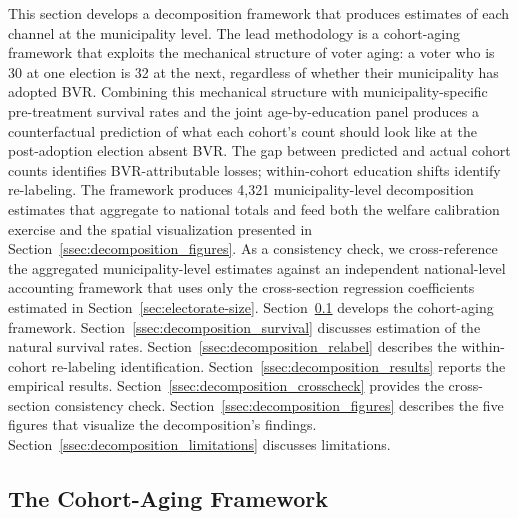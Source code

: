 This section develops a decomposition framework that produces estimates of each channel at the municipality level. The lead methodology is a cohort-aging framework that exploits the mechanical structure of voter aging: a voter who is 30 at one election is 32 at the next, regardless of whether their municipality has adopted BVR. Combining this mechanical structure with municipality-specific pre-treatment survival rates and the joint age-by-education panel produces a counterfactual prediction of what each cohort's count should look like at the post-adoption election absent BVR. The gap between predicted and actual cohort counts identifies BVR-attributable losses; within-cohort education shifts identify re-labeling. The framework produces 4{,}321 municipality-level decomposition estimates that aggregate to national totals and feed both the welfare calibration exercise and the spatial visualization presented in Section~\ref{ssec:decomposition_figures}. As a consistency check, we cross-reference the aggregated municipality-level estimates against an independent national-level accounting framework that uses only the cross-section regression coefficients estimated in Section~\ref{sec:electorate-size}. Section~\ref{ssec:decomposition_mun_math} develops the cohort-aging framework. Section~\ref{ssec:decomposition_survival} discusses estimation of the natural survival rates. Section~\ref{ssec:decomposition_relabel} describes the within-cohort re-labeling identification. Section~\ref{ssec:decomposition_results} reports the empirical results. Section~\ref{ssec:decomposition_crosscheck} provides the cross-section consistency check. Section~\ref{ssec:decomposition_figures} describes the five figures that visualize the decomposition's findings. Section~\ref{ssec:decomposition_limitations} discusses limitations.

\subsection{The Cohort-Aging Framework}
\label{ssec:decomposition_mun_math}

